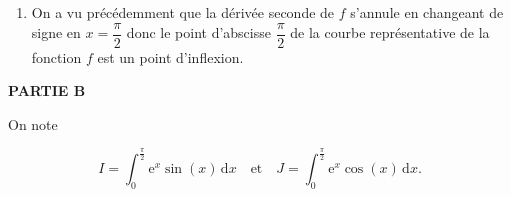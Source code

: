 \documentclass[10pt]{article}
\providecommand{\e}{{\mathrm{e}}}
\begin{document}
\begin{enumerate}
\begin{enumerate}
		\item En anticipant la question \textbf{3.}, on va étudier la convexité de la fonction sur $[0 ~;~ \pi]$.

Pour tout réel $x$ de l'intervalle $\left[0~;\pi\right]$ :

$\begin{aligned}
f''(x) & = \e^x \left( \sin(x) +\cos(x)\right)  + \e^x\left( \cos(x) -\sin(x)\right)\\
	& = \e^x \left( \sin(x) +\cos(x) +\cos(x) -\sin(x)\right)\\
	&= 2 \e^x \cos(x)
\end{aligned}$.

On a le tableau de signes suivant :

\hfill~\hfill~

donc pour tout réel $x$ de l'intervalle $\left[0~;~\dfrac{\pi}{2}\right]$, $f''(x)>0$

d'où la fonction $f$ est convexe sur l'intervalle  $\left[0~;~\dfrac{\pi}{2}\right]$.
		\item La courbe représentative d'une fonction convexe est au-dessus de toutes ses tangentes, en particulier ici, la courbe $\mathcal{C}_f$  est au-dessus de la tangente à la courbe $\mathcal{C}_f$ au point d'abscisse 0, d'équation $y = x$ (d'après la question précédente).

On a donc, pour tout réel $x$ de l'intervalle $\left[0~;~\dfrac{\pi}{2}\right]$,\quad $\e^x \sin (x) \geqslant x$.
	\end{enumerate}
\item On a vu précédemment que la dérivée seconde de $f$ s'annule en changeant de signe en $x=\dfrac{\pi}{2}$ donc le point d'abscisse $\dfrac{\pi}{2}$ de la courbe représentative de la fonction $f$ est un point d'inflexion.
\end{enumerate}

\bigskip

\textbf{PARTIE B}

\medskip


On note

\[I = \displaystyle\int_0^{\frac{\pi}{2}} \e^x \sin (x)\, \text{d}x\quad  \text{et}\quad J = \displaystyle\int_0^{\frac{\pi}{2}} \e^x \cos (x)\, \text{d}x.\]

\smallskip
\end{document}

